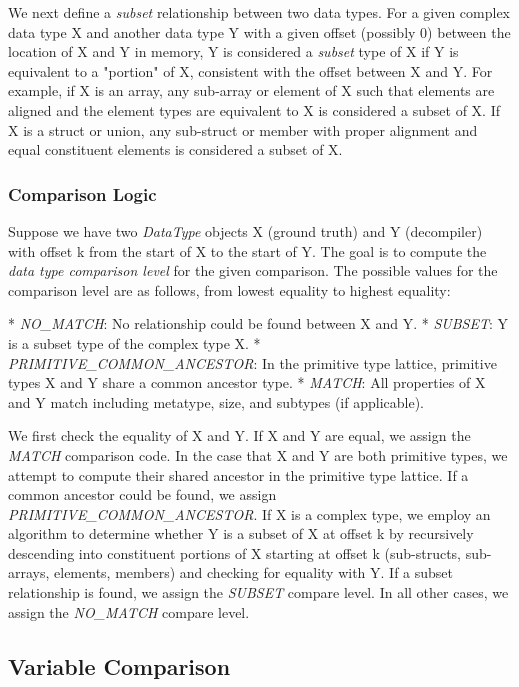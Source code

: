 We next define a \emph{subset} relationship between two data types. For a given complex data type X and another data type Y with a given offset (possibly 0) between the location of X and Y in memory, Y is considered a \emph{subset} type of X if Y is equivalent to a "portion" of X, consistent with the offset between X and Y. For example, if X is an array, any sub-array or element of X such that elements are aligned and the element types are equivalent to X is considered a subset of X. If X is a struct or union, any sub-struct or member with proper alignment and equal constituent elements is considered a subset of X.

\subsubsection{Comparison Logic}

Suppose we have two \emph{DataType} objects X (ground truth) and Y (decompiler) with offset k from the start of X to the start of Y. The goal is to compute the \emph{data type comparison level} for the given comparison. The possible values for the comparison level are as follows, from lowest equality to highest equality:

* \emph{NO\_MATCH}: No relationship could be found between X and Y.
* \emph{SUBSET}: Y is a subset type of the complex type X.
* \emph{PRIMITIVE\_COMMON\_ANCESTOR}: In the primitive type lattice, primitive types X and Y share a common ancestor type.
* \emph{MATCH}: All properties of X and Y match including metatype, size, and subtypes (if applicable).

We first check the equality of X and Y. If X and Y are equal, we assign the \emph{MATCH} comparison code. In the case that X and Y are both primitive types, we attempt to compute their shared ancestor in the primitive type lattice. If a common ancestor could be found, we assign \emph{PRIMITIVE\_COMMON\_ANCESTOR}. If X is a complex type, we employ an algorithm to determine whether Y is a subset of X at offset k by recursively descending into constituent portions of X starting at offset k (sub-structs, sub-arrays, elements, members) and checking for equality with Y. If a subset relationship is found, we assign the \emph{SUBSET} compare level. In all other cases, we assign the \emph{NO\_MATCH} compare level.

\subsection{Variable Comparison}

